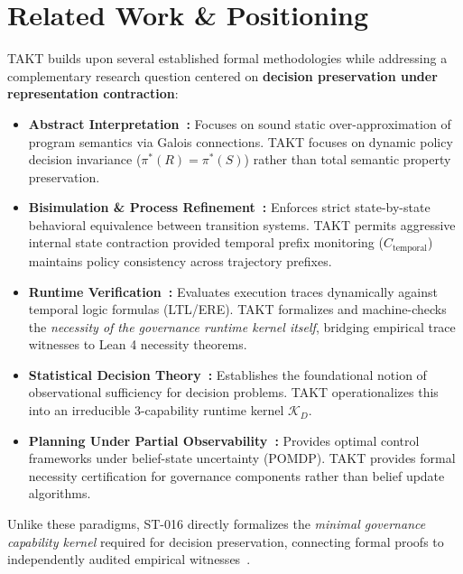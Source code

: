 \section{Related Work \& Positioning}

TAKT builds upon several established formal methodologies while addressing a complementary research question centered on \textbf{decision preservation under representation contraction}:

\begin{itemize}\sloppy
    \item \textbf{Abstract Interpretation~\cite{cousot1977abstract}:} Focuses on sound static over-approximation of program semantics via Galois connections. TAKT focuses on dynamic policy decision invariance ($\pi^*(R) = \pi^*(S)$) rather than total semantic property preservation.

    \item \textbf{Bisimulation \& Process Refinement~\cite{milner1989communication,park1981concurrency}:} Enforces strict state-by-state behavioral equivalence between transition systems. TAKT permits aggressive internal state contraction provided temporal prefix monitoring ($C_{\text{temporal}}$) maintains policy consistency across trajectory prefixes.

    \item \textbf{Runtime Verification~\cite{leucker2009brief}:} Evaluates execution traces dynamically against temporal logic formulas (LTL/ERE). TAKT formalizes and machine-checks the \textit{necessity of the governance runtime kernel itself}, bridging empirical trace witnesses to Lean 4 necessity theorems.

    \item \textbf{Statistical Decision Theory~\cite{blackwell1951comparison}:} Establishes the foundational notion of observational sufficiency for decision problems. TAKT operationalizes this into an irreducible 3-capability runtime kernel $\mathcal{K}_D$.

    \item \textbf{Planning Under Partial Observability~\cite{kaelbling1998planning}:} Provides optimal control frameworks under belief-state uncertainty (POMDP). TAKT provides formal necessity certification for governance components rather than belief update algorithms.
\end{itemize}

Unlike these paradigms, ST-016 directly formalizes the \emph{minimal governance capability kernel} required for decision preservation, connecting formal proofs to independently audited empirical witnesses~\cite{takt_st016_2026}.
